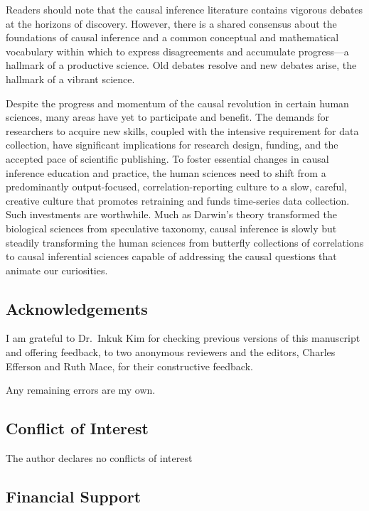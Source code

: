 \documentclass[
  single column]{article}
\begin{document}
Readers should note that the causal inference literature contains
vigorous debates at the horizons of discovery. However, there is a
shared consensus about the foundations of causal inference and a common
conceptual and mathematical vocabulary within which to express
disagreements and accumulate progress---a hallmark of a productive
science. Old debates resolve and new debates arise, the hallmark of a
vibrant science.

Despite the progress and momentum of the causal revolution in certain
human sciences, many areas have yet to participate and benefit. The
demands for researchers to acquire new skills, coupled with the
intensive requirement for data collection, have significant implications
for research design, funding, and the accepted pace of scientific
publishing. To foster essential changes in causal inference education
and practice, the human sciences need to shift from a predominantly
output-focused, correlation-reporting culture to a slow, careful,
creative culture that promotes retraining and funds time-series data
collection. Such investments are worthwhile. Much as Darwin's theory
transformed the biological sciences from speculative taxonomy, causal
inference is slowly but steadily transforming the human sciences from
butterfly collections of correlations to causal inferential sciences
capable of addressing the causal questions that animate our curiosities.

\newpage{}

\subsection{Acknowledgements}\label{acknowledgements}

I am grateful to Dr.~Inkuk Kim for checking previous versions of this
manuscript and offering feedback, to two anonymous reviewers and the
editors, Charles Efferson and Ruth Mace, for their constructive
feedback.

Any remaining errors are my own.

\subsection{Conflict of Interest}\label{conflict-of-interest}

The author declares no conflicts of interest

\subsection{Financial Support}\label{financial-support}
\end{document}
